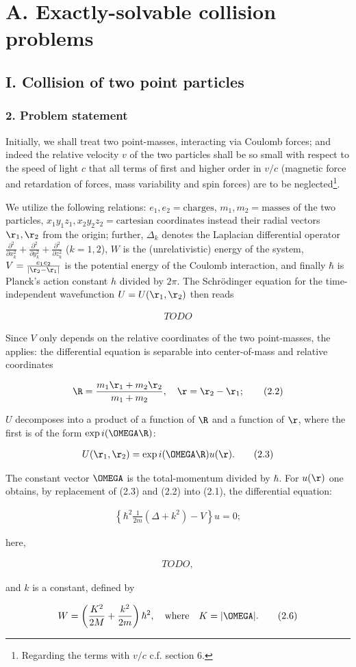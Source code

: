 \documentclass{report}
\newcommand{\nequ}[2]{
\begin{align*}
#1
\tag{#2}
\end{align*}
}
\begin{document}
\part*{A. Exactly-solvable collision problems}
\chapter*{I. Collision of two point particles}
\section*{2. Problem statement}
Initially, we shall treat two point-masses, interacting via Coulomb forces; and indeed the relative velocity $v$ of the two particles shall be so small with respect to the speed of light $c$ that all terms of first and higher order in $v/c$ (magnetic force and retardation of forces, mass variability and spin forces) are to be neglected\footnote{Regarding the terms with $v/c$ c.f. section 6.}.

We utilize the following relations: $e_1,e_2=\text{charges}$, $m_1,m_2=\text{masses}$ of the two particles, $x_1 y_1 z_1, x_2 y_2 z_2 = \text{cartesian coordinates}$  instead their radial vectors $\r_1,\r_2$ from the origin; further, $\Delta_k$ denotes the Laplacian differential operator $\frac{\partial^2}{\partial x_k^2} + \frac{\partial^2}{\partial y_k^2} + \frac{\partial^2}{\partial z_k^2}$ ($k=1,2$), $W$ is the (unrelativistic) energy of the system, $V=\frac{e_1 e_2}{|\r_2-\r_1|}$ is the potential energy of the Coulomb interaction, and finally $\hbar$ is Planck's action constant $h$ divided by $2\pi$. The Schr\"odinger equation for the time-independent wavefunction $U=U(\r_1,\r_2)$ then reads
\nequ{
TODO
}{2.1}
Since $V$ only depends on the relative coordinates of the two point-masses, the  applies: the differential equation is separable into center-of-mass and relative coordinates
\nequ{
\R=\frac{m_1 \r_1 + m_2 \r_2}{m_1+m_2},\quad \r=\r_2 - \r_1;
}{2.2}
$U$ decomposes into a product of a function of $\R$ and a function of $\r$, where the first is of the form $\exp{i(\OMEGA\R)}$:
\nequ{
U(\r_1,\r_2) = \exp{i(\OMEGA\R)}u(\r).
}{2.3}
The constant vector $\OMEGA$ is the total-momentum divided by $\hbar$. For $u(\r)$ one obtains, by replacement of (2.3) and (2.2)
into (2.1), the differential equation:
\nequ{
\left\{\hbar^2 \frac{1}{2m}(\Delta + k^2) - V\right\}u = 0;
}{2.4}
here,
\nequ{
TODO,
}{2.5}
and $k$ is a constant, defined by
\nequ{
W=\left(\frac{K^2}{2M} + \frac{k^2}{2m}\right)\hbar^2,\quad\text{where}\quad K=|\OMEGA|.
}{2.6}
\end{document}
